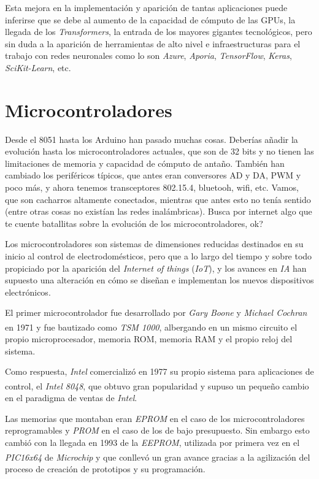 Esta mejora en la implementación y aparición de tantas aplicaciones
puede inferirse que se debe al aumento de la capacidad de cómputo de
las GPUs, la llegada de los \textit{Transformers},
la entrada de los mayores gigantes tecnológicos, pero sin
duda a la aparición de herramientas de alto nivel e infraestructuras
para el trabajo con redes neuronales como lo son \textit{Azure},
\textit{Aporia}, \textit{TensorFlow}, \textit{Keras}, \textit{SciKit-Learn},
etc.


\section{Microcontroladores}
{\color{red}
Desde el 8051 hasta los Arduino han
pasado muchas cosas. Deberías añadir la evolución hasta los
microcontroladores actuales, que son de 32 bits y no tienen las
limitaciones de memoria y capacidad de cómputo de antaño. También
han cambiado los periféricos típicos, que antes eran conversores AD
y DA, PWM y poco más, y ahora tenemos transceptores 802.15.4,
bluetooh, wifi, etc. Vamos, que son cacharros altamente conectados,
mientras que antes esto no tenía sentido (entre otras cosas no
existían las redes inalámbricas). Busca por internet algo que te
cuente batallitas sobre la evolución de los microcontroladores, ok?}


Los microcontroladores son sistemas de dimensiones reducidas destinados en
su inicio al control de electrodomésticos, pero que a lo largo del tiempo
y sobre todo propiciado por la aparición del \textit{Internet of things} (\textit{IoT}),
y los avances en \textit{IA} han supuesto una alteración en cómo se diseñan
e implementan los nuevos dispositivos electrónicos.

El primer microcontrolador fue desarrollado por \textit{Gary Boone} y
\textit{Michael Cochran} en 1971 y fue bautizado como \textit{TSM 1000}\textsuperscript{\cite{mccon}},
albergando en un mismo circuito el propio microprocesador, memoria ROM, memoria
RAM y el propio reloj del sistema.

Como respuesta, \textit{Intel} comercializó en 1977 su propio sistema para
aplicaciones de control, el \textit{Intel 8048}\textsuperscript{\cite{mcs48}}, que obtuvo gran popularidad
y supuso un pequeño cambio en el paradigma de ventas de \textit{Intel}.

Las memorias que montaban eran \textit{EPROM} en el caso de los microcontroladores
reprogramables y \textit{PROM} en el caso de los de bajo  presupuesto. Sin embargo esto
cambió con la llegada en 1993 de la \textit{EEPROM}, utilizada por primera vez
en el \textit{PIC16x64}\textsuperscript{\cite{mccon}} de \textit{Microchip} y que conllevó un gran avance
gracias a la agilización del proceso de creación de prototipos y su programación.

